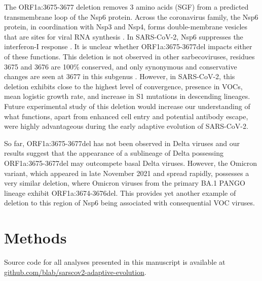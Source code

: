 \documentclass[11pt,oneside,letterpaper]{article}
\begin{document}
The ORF1a:3675-3677 deletion removes 3 amino acids (SGF) from a predicted transmembrane loop \cite{Benvenuto2020-uc} of the Nsp6 protein.
Across the coronavirus family, the Nsp6 protein, in coordination with Nsp3 and Nsp4, forms double-membrane vesicles that are sites for viral RNA synthesis \cite{Snijder2020-vx}.
In SARS-CoV-2, Nsp6 suppresses the interferon-I response \cite{Xia2020-zs}. It is unclear whether ORF1a:3675-3677del impacts either of these functions.
This deletion is not observed in other sarbecoviruses, residues 3675 and 3676 are 100\% conserved, and only synonymous and conservative changes are seen at 3677 in this subgenus \cite{Jungreis2021-vv}.
However, in SARS-CoV-2, this deletion exhibits close to the highest level of convergence, presence in VOCs, mean logistic growth rate, and increase in S1 mutations in descending lineages.
Future experimental study of this deletion would increase our understanding of what functions, apart from enhanced cell entry and potential antibody escape, were highly advantageous during the early adaptive evolution of SARS-CoV-2.

So far, ORF1a:3675-3677del has not been observed in Delta viruses and our results suggest that the appearance of a sublineage of Delta possessing ORF1a:3675-3677del may outcompete basal Delta viruses.
However, the Omicron variant, which appeared in late November 2021 and spread rapidly, possesses a very similar deletion, where Omicron viruses from the primary BA.1 PANGO lineage exhibit ORF1a:3674-3676del.
This provides yet another example of deletion to this region of Nsp6 being associated with consequential VOC viruses.

\section*{Methods}

\sloppy Source code for all analyses presented in this manuscript is available at \href{https://github.com/blab/sarscov2-adaptive-evolution}{github.com/blab/sarscov2-adaptive-evolution}.
\end{document}
